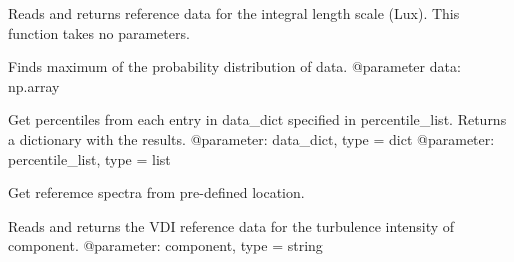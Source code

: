 \documentclass[letterpaper,10pt,english]{sphinxmanual}
\begin{document}
\begin{fulllineitems}
\label{\detokenize{index:windtunnel.get_lux_referencedata}}
Reads and returns reference data for the integral length scale (Lux).
This function takes no parameters.

\end{fulllineitems}


\begin{fulllineitems}
\label{\detokenize{index:windtunnel.get_pdf_max}}
Finds maximum of the probability distribution of data.
@parameter data: np.array

\end{fulllineitems}


\begin{fulllineitems}
\label{\detokenize{index:windtunnel.get_percentiles}}
Get percentiles from each entry in data\_dict specified in
percentile\_list. Returns a dictionary with the results.
@parameter: data\_dict, type = dict
@parameter: percentile\_list, type = list

\end{fulllineitems}


\begin{fulllineitems}
\label{\detokenize{index:windtunnel.get_reference_spectra}}
Get referemce spectra from pre-defined location.

\end{fulllineitems}


\begin{fulllineitems}
\label{\detokenize{index:windtunnel.get_turb_referencedata}}
Reads and returns the VDI reference data for the turbulence intensity of
component.
@parameter: component, type = string

\end{fulllineitems}
\end{document}
